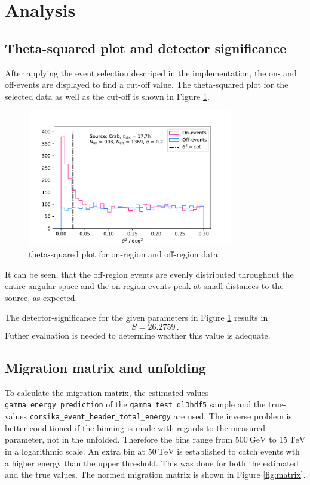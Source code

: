 \section{Analysis}
\label{sec:auswertung}

\subsection{Theta-squared plot and detector significance}
After applying the event selection descriped in the implementation, the on- and off-events are 
displayed to find a cut-off value. 
The theta-squared plot for the selected data as well as the cut-off is shown in Figure \ref{fig:onoff}.

\begin{figure}[H]
  \centering
  \includegraphics[width=0.8\textwidth]{plots/On_Off2.pdf}
  \caption{theta-squared plot for on-region and off-region data.}
  \label{fig:onoff}
\end{figure}

It can be seen, that the off-region events are evenly distributed throughout the entire angular space and the on-region events peak at small distances to the source, as expected.

The detector-significance for the given parameters in Figure \ref{fig:onoff} results in
\begin{equation}
  S = 26.2759\,.
\end{equation}
Futher evaluation is needed to determine weather this value is adequate.

\subsection{Migration matrix and unfolding}
To calculate the migration matrix, the estimated values \texttt{gamma\_energy\_prediction} of the \texttt{gamma\_test\_dl3\.hdf5} 
sample and the true-values \texttt{corsika\_event\_header\_total\_energy} are used.
The inverse problem is better conditioned if the binning is made with regards to the measured parameter, not in the unfolded.
Therefore the bins range from $\SI{500}{\giga\electronvolt}$ to $\SI{15}{\tera\electronvolt}$ in a logarithmic scale. 
An extra bin at $\SI{50}{\tera\electronvolt}$ is established to catch events wth a higher energy than the upper threshold.
This was done for both the estimated and the true values. The normed migration matrix is shown in Figure \ref{fig:matrix}.


